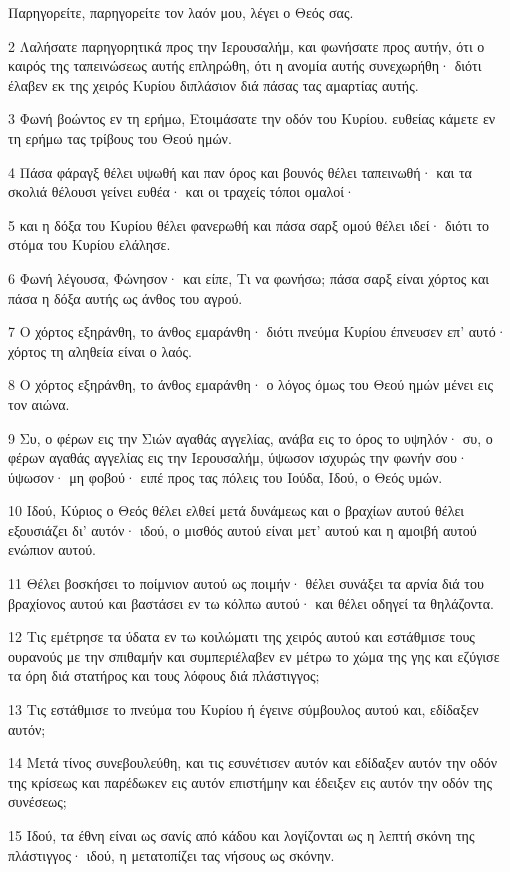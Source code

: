 \par Παρηγορείτε, παρηγορείτε τον λαόν μου, λέγει ο Θεός σας.
\par 2 Λαλήσατε παρηγορητικά προς την Ιερουσαλήμ, και φωνήσατε προς αυτήν, ότι ο καιρός της ταπεινώσεως αυτής επληρώθη, ότι η ανομία αυτής συνεχωρήθη· διότι έλαβεν εκ της χειρός Κυρίου διπλάσιον διά πάσας τας αμαρτίας αυτής.
\par 3 Φωνή βοώντος εν τη ερήμω, Ετοιμάσατε την οδόν του Κυρίου. ευθείας κάμετε εν τη ερήμω τας τρίβους του Θεού ημών.
\par 4 Πάσα φάραγξ θέλει υψωθή και παν όρος και βουνός θέλει ταπεινωθή· και τα σκολιά θέλουσι γείνει ευθέα· και οι τραχείς τόποι ομαλοί·
\par 5 και η δόξα του Κυρίου θέλει φανερωθή και πάσα σαρξ ομού θέλει ιδεί· διότι το στόμα του Κυρίου ελάλησε.
\par 6 Φωνή λέγουσα, Φώνησον· και είπε, Τι να φωνήσω; πάσα σαρξ είναι χόρτος και πάσα η δόξα αυτής ως άνθος του αγρού.
\par 7 Ο χόρτος εξηράνθη, το άνθος εμαράνθη· διότι πνεύμα Κυρίου έπνευσεν επ' αυτό· χόρτος τη αληθεία είναι ο λαός.
\par 8 Ο χόρτος εξηράνθη, το άνθος εμαράνθη· ο λόγος όμως του Θεού ημών μένει εις τον αιώνα.
\par 9 Συ, ο φέρων εις την Σιών αγαθάς αγγελίας, ανάβα εις το όρος το υψηλόν· συ, ο φέρων αγαθάς αγγελίας εις την Ιερουσαλήμ, ύψωσον ισχυρώς την φωνήν σου· ύψωσον· μη φοβού· ειπέ προς τας πόλεις του Ιούδα, Ιδού, ο Θεός υμών.
\par 10 Ιδού, Κύριος ο Θεός θέλει ελθεί μετά δυνάμεως και ο βραχίων αυτού θέλει εξουσιάζει δι' αυτόν· ιδού, ο μισθός αυτού είναι μετ' αυτού και η αμοιβή αυτού ενώπιον αυτού.
\par 11 Θέλει βοσκήσει το ποίμνιον αυτού ως ποιμήν· θέλει συνάξει τα αρνία διά του βραχίονος αυτού και βαστάσει εν τω κόλπω αυτού· και θέλει οδηγεί τα θηλάζοντα.
\par 12 Τις εμέτρησε τα ύδατα εν τω κοιλώματι της χειρός αυτού και εστάθμισε τους ουρανούς με την σπιθαμήν και συμπεριέλαβεν εν μέτρω το χώμα της γης και εζύγισε τα όρη διά στατήρος και τους λόφους διά πλάστιγγος;
\par 13 Τις εστάθμισε το πνεύμα του Κυρίου ή έγεινε σύμβουλος αυτού και, εδίδαξεν αυτόν;
\par 14 Μετά τίνος συνεβουλεύθη, και τις εσυνέτισεν αυτόν και εδίδαξεν αυτόν την οδόν της κρίσεως και παρέδωκεν εις αυτόν επιστήμην και έδειξεν εις αυτόν την οδόν της συνέσεως;
\par 15 Ιδού, τα έθνη είναι ως σανίς από κάδου και λογίζονται ως η λεπτή σκόνη της πλάστιγγος· ιδού, η μετατοπίζει τας νήσους ως σκόνην.

